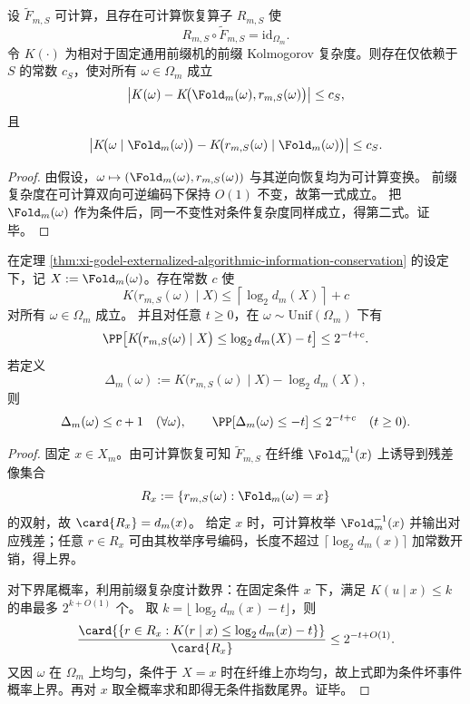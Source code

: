 \begin{theorem}\label{thm:xi-godel-externalized-algorithmic-information-conservation}
设 \(\widetilde F_{m,S}\) 可计算，且存在可计算恢复算子 \(R_{m,S}\) 使
\[
R_{m,S}\circ \widetilde F_{m,S}=\mathrm{id}_{\Omega_m}.
\]
令 \(K(\cdot)\) 为相对于固定通用前缀机的前缀 Kolmogorov 复杂度。则存在仅依赖于 \(S\) 的常数 \(c_S\)，使对所有 \(\omega\in\Omega_m\) 成立
\[
\left|K(\omega)-K\!\bigl(\Fold_m(\omega),r_{m,S}(\omega)\bigr)\right|\le c_S,
\]
且
\[
\left|K\!\bigl(\omega\mid \Fold_m(\omega)\bigr)-K\!\bigl(r_{m,S}(\omega)\mid \Fold_m(\omega)\bigr)\right|\le c_S.
\]
\end{theorem}
\begin{proof}
由假设，\(\omega\mapsto (\Fold_m(\omega),r_{m,S}(\omega))\) 与其逆向恢复均为可计算变换。
前缀复杂度在可计算双向可逆编码下保持 \(O(1)\) 不变，故第一式成立。
把 \(\Fold_m(\omega)\) 作为条件后，同一不变性对条件复杂度同样成立，得第二式。证毕。
\end{proof}

\begin{theorem}[条件复杂度与纤维对数体积的双侧夹逼及指数尾界]\label{thm:xi-register-conditional-complexity-vs-fiber-volume}
在定理 \ref{thm:xi-godel-externalized-algorithmic-information-conservation} 的设定下，记 \(X:=\Fold_m(\omega)\)。存在常数 \(c\) 使
\[
K\!\bigl(r_{m,S}(\omega)\mid X\bigr)\le \left\lceil\log_2 d_m(X)\right\rceil+c
\]
对所有 \(\omega\in\Omega_m\) 成立。
并且对任意 \(t\ge 0\)，在 \(\omega\sim\mathrm{Unif}(\Omega_m)\) 下有
\[
\PP\!\left[
K\!\bigl(r_{m,S}(\omega)\mid X\bigr)\le \log_2 d_m(X)-t
\right]\le 2^{-t+c}.
\]
若定义
\[
\Delta_m(\omega):=K\!\bigl(r_{m,S}(\omega)\mid X\bigr)-\log_2 d_m(X),
\]
则
\[
\Delta_m(\omega)\le c+1\quad(\forall \omega),
\qquad
\PP\!\left[\Delta_m(\omega)\le -t\right]\le 2^{-t+c}\quad(t\ge0).
\]
\end{theorem}
\begin{proof}
固定 \(x\in X_m\)。由可计算恢复可知 \(\widetilde F_{m,S}\) 在纤维 \(\Fold_m^{-1}(x)\) 上诱导到残差像集合
\[
R_x:=\{r_{m,S}(\omega):\Fold_m(\omega)=x\}
\]
的双射，故 \(\card{R_x}=d_m(x)\)。
给定 \(x\) 时，可计算枚举 \(\Fold_m^{-1}(x)\) 并输出对应残差；任意 \(r\in R_x\) 可由其枚举序号编码，长度不超过 \(\lceil\log_2 d_m(x)\rceil\) 加常数开销，得上界。

对下界尾概率，利用前缀复杂度计数界：在固定条件 \(x\) 下，满足 \(K(u\mid x)\le k\) 的串最多 \(2^{k+O(1)}\) 个。
取 \(k=\lfloor \log_2 d_m(x)-t\rfloor\)，则
\[
\frac{\card{\{r\in R_x:K(r\mid x)\le \log_2 d_m(x)-t\}}}{\card{R_x}}
\le 2^{-t+O(1)}.
\]
又因 \(\omega\) 在 \(\Omega_m\) 上均匀，条件于 \(X=x\) 时在纤维上亦均匀，故上式即为条件坏事件概率上界。再对 \(x\) 取全概率求和即得无条件指数尾界。证毕。
\end{proof}

